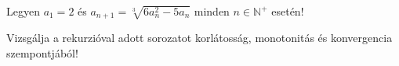 \documentclass[11pt]{scrartcl}
\begin{document}
Legyen $a_1 = 2$ és $a_{n + 1} = \sqrt[3]{6a_n^2 - 5a_n}$ minden
$n \in \mathbb{N}^+$ esetén!

Vizsgálja a rekurzióval adott sorozatot korlátosság, monotonitás és
konvergencia szempontjából!
\end{document}
